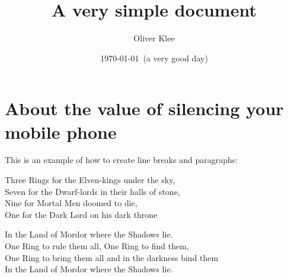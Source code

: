 \documentclass[a4paper]{scrartcl}
\title{A very simple document}
\author{Oliver Klee}
\date{\today\ (a very good day)}
\begin{document}
\maketitle

\section{About the value of silencing your mobile phone}

This is an example of how to create line breaks and paragraphs:

Three Rings for the Elven-kings under the sky,\\
Seven for the Dwarf-lords in their halls of stone,\\
Nine for Mortal Men doomed to die,\\
One for the Dark Lord on his dark throne

In the Land of Mordor where the Shadows lie.\\
One Ring to rule them all, One Ring to find them,\\
One Ring to bring them all and in the darkness bind them\\
In the Land of Mordor where the Shadows lie.
\end{document}
